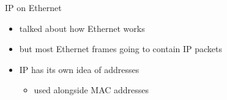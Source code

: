 \begin{frame}{IP on Ethernet}
    \begin{itemize}
    \item talked about how Ethernet works
    \item but most Ethernet frames going to contain IP packets
    \vspace{.5cm}
    \item IP has its own idea of addresses
        \begin{itemize}
        \item used alongside MAC addresses
        \end{itemize}
    \end{itemize}
\end{frame}
